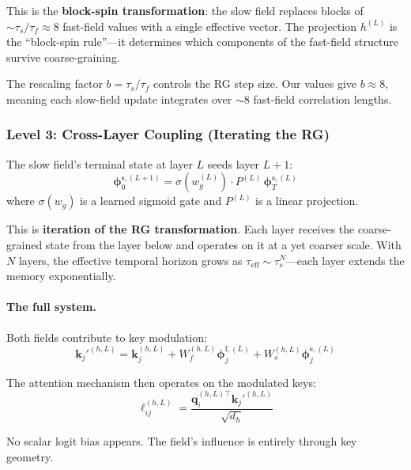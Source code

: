 \documentclass[11pt,a4paper]{article}
\newcommand{\vfield}{\boldsymbol{\phi}}
\newcommand{\q}{\mathbf{q}}
\newcommand{\K}{\mathbf{k}}
\begin{document}
This is the \textbf{block-spin transformation}: the slow field
replaces blocks of $\sim\!\tau_s/\tau_f \approx 8$ fast-field values
with a single effective vector.  The projection $h^{(L)}$ is the
``block-spin rule''---it determines which components of the
fast-field structure survive coarse-graining.

The rescaling factor $b = \tau_s / \tau_f$ controls the RG step
size.  Our values give $b \approx 8$, meaning each slow-field
update integrates over $\sim$8 fast-field correlation lengths.

\subsubsection{Level 3: Cross-Layer Coupling (Iterating the RG)}

The slow field's terminal state at layer $L$ seeds layer $L{+}1$:
\begin{equation}
  \vfield^{\mathrm{s},(L+1)}_0
    = \sigma\!\left(w_g^{(L)}\right) \cdot
      P^{(L)} \, \vfield^{\mathrm{s},(L)}_T
  \label{eq:cross-layer}
\end{equation}
where $\sigma(w_g)$ is a learned sigmoid gate and $P^{(L)}$ is a
linear projection.

This is \textbf{iteration of the RG transformation}.  Each layer
receives the coarse-grained state from the layer below and operates
on it at a yet coarser scale.  With $N$ layers, the effective
temporal horizon grows as $\tau_{\mathrm{eff}} \sim \tau_s^N$---each
layer extends the memory exponentially.

\paragraph{The full system.}  Both fields contribute to key
modulation:
\begin{equation}
  \K_j'^{(h,L)} = \K_j^{(h,L)}
    + W_f^{(h,L)} \vfield^{\mathrm{f},(L)}_j
    + W_s^{(h,L)} \vfield^{\mathrm{s},(L)}_j
  \label{eq:full-key-mod}
\end{equation}

The attention mechanism then operates on the modulated keys:
\begin{equation}
  \ell_{ij}^{(h,L)}
    = \frac{\q_i^{(h,L)\top} \K_j'^{(h,L)}}{\sqrt{d_h}}
  \label{eq:full-attention}
\end{equation}

No scalar logit bias appears.  The field's influence is entirely
through key geometry.
\end{document}
